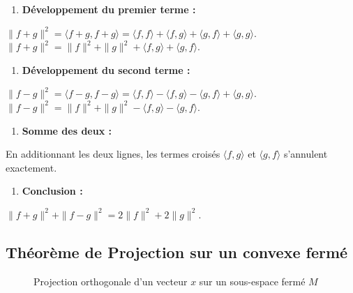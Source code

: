 \documentclass[11pt,a4paper]{article}
\begin{document}
\begin{enumerate}
\item \textbf{Développement du premier terme :}
\end{enumerate}
   $\|f+g\|^2 = \langle f+g, f+g \rangle = \langle f, f \rangle + \langle f, g \rangle + \langle g, f \rangle + \langle g, g \rangle$.
   $\|f+g\|^2 = \|f\|^2 + \|g\|^2 + \langle f, g \rangle + \langle g, f \rangle$.
\begin{enumerate}
\item \textbf{Développement du second terme :}
\end{enumerate}
   $\|f-g\|^2 = \langle f-g, f-g \rangle = \langle f, f \rangle - \langle f, g \rangle - \langle g, f \rangle + \langle g, g \rangle$.
   $\|f-g\|^2 = \|f\|^2 + \|g\|^2 - \langle f, g \rangle - \langle g, f \rangle$.
\begin{enumerate}
\item \textbf{Somme des deux :}
\end{enumerate}
   En additionnant les deux lignes, les termes croisés $\langle f, g \rangle$ et $\langle g, f \rangle$ s'annulent exactement.
\begin{enumerate}
\item \textbf{Conclusion :}
\end{enumerate}
   $\|f+g\|^2 + \|f-g\|^2 = 2\|f\|^2 + 2\|g\|^2$.

\subsection{Théorème de Projection sur un convexe fermé}

\begin{figure}[h!]
\centering
{}
\caption{Projection orthogonale d'un vecteur $x$ sur un sous-espace fermé $M$}
\end{figure}
\end{document}

